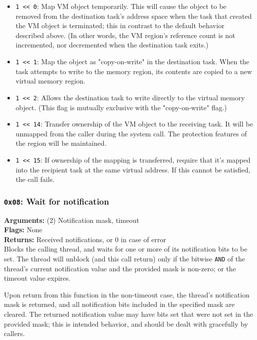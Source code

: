 \documentclass[11pt]{article}
\begin{document}
\begin{itemize}
\item \texttt{1 << 0}: Map VM object temporarily. This will cause the object to be removed from the destination task's address space when the task that created the VM object is terminated; this in contrast to the default behavior described above. (In other words, the VM region's reference count is not incremented, nor decremented when the destination task exits.)
\item \texttt{1 << 1}: Map the object as "copy-on-write" in the destination task. When the task attempts to write to the memory region, its contents are copied to a new virtual memory region.
\item \texttt{1 << 2}: Allows the destination task to write directly to the virtual memory object. (This flag is mutually exclusive with the "copy-on-write" flag.)
\item \texttt{1 << 14}: Transfer ownership of the VM object to the receiving task. It will be unmapped from the caller during the system call. The protection features of the region will be maintained.
\item \texttt{1 << 15}: If ownership of the mapping is transferred, require that it's mapped into the recipient task at the same virtual address. If this cannot be satisfied, the call fails.
\end{itemize}

\subsubsection{{\tt 0x08}: Wait for notification}
\textbf{Arguments:} (2) Notification mask, timeout \\
\textbf{Flags:} None \\
\textbf{Returns:} Received notifications, or 0 in case of error \\

Blocks the calling thread, and waits for one or more of its notification bits to be set. The thread will unblock (and this call return) only if the bitwise \texttt{AND} of the thread's current notification value and the provided mask is non-zero; or the timeout value expires.

Upon return from this function in the non-timeout case, the thread's notification mask is returned, and all notification bits included in the specified mask are cleared. The returned notification value may have bits set that were not set in the provided mask; this is intended behavior, and should be dealt with gracefully by callers.
\end{document}
